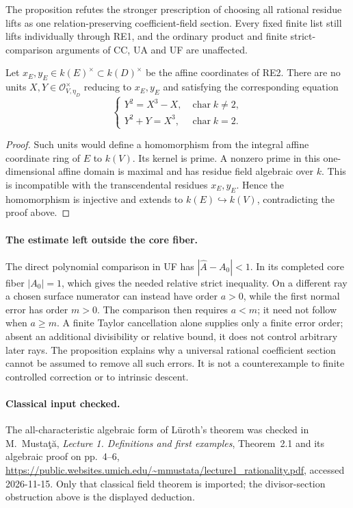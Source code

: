 The proposition refutes the stronger prescription
of choosing all rational residue lifts as one
relation-preserving coefficient-field section.
Every fixed finite list still lifts individually
through RE1, and the ordinary product and finite
strict-comparison arguments of CC, UA and UF are
unaffected.

\begin{corollary}
\label{cor:r13-finite-relation-no-exact-lift}
Let \(x_E,y_E\in k(E)^\times\subset k(D)^\times\)
be the affine coordinates of RE2.  There are no units
\(X,Y\in\mathcal O_{V,\eta_D}^\times\) reducing to
\(x_E,y_E\) and satisfying the corresponding equation
\[
 \begin{cases}
 Y^2=X^3-X,&\operatorname{char}k\ne2,\\
 Y^2+Y=X^3,&\operatorname{char}k=2.
 \end{cases}
\tag{RE5}
\]
\end{corollary}

\begin{proof}
Such units would define a homomorphism from the
integral affine coordinate ring of \(E\) to \(k(V)\).
Its kernel is prime.  A nonzero prime in this
one-dimensional affine domain is maximal and has
residue field algebraic over \(k\).  This is
incompatible with the transcendental residues
\(x_E,y_E\).  Hence the homomorphism is injective
and extends to \(k(E)\hookrightarrow k(V)\),
contradicting the proof above.
\end{proof}

\paragraph{The estimate left outside the core fiber.}
The direct polynomial comparison in UF has
\(|\widehat A-A_0|<1\).  In its completed core
fiber \(|A_0|=1\), which gives the needed relative
strict inequality.  On a different ray a chosen
surface numerator can instead have order \(a>0\),
while the first normal error has order \(m>0\).
The comparison then requires \(a<m\); it need
not follow when \(a\ge m\).  A finite Taylor
cancellation alone supplies only a finite error
order; absent an additional divisibility or
relative bound, it does not control arbitrary
later rays.  The proposition
explains why a universal rational coefficient
section cannot be assumed to remove all such
errors.  It is not a counterexample to finite
controlled correction or to intrinsic descent.

\paragraph{Classical input checked.}
The all-characteristic algebraic form of L\"uroth's
theorem was checked in M.~Musta\c t\u a,
\emph{Lecture 1. Definitions and first examples},
Theorem~2.1 and its algebraic proof on pp.~4--6,
\url{https://public.websites.umich.edu/~mmustata/lecture1_rationality.pdf},
accessed 2026-11-15.  Only that classical field theorem
is imported; the divisor-section obstruction above
is the displayed deduction.

